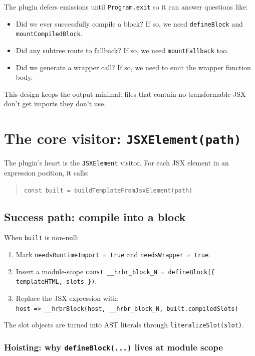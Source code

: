 The plugin defers emissions until \texttt{Program.exit} so it can answer questions like:

\begin{itemize}
\item Did we ever successfully compile a block? If so, we need \texttt{defineBlock} and \texttt{mountCompiledBlock}.
\item Did any subtree route to fallback? If so, we need \texttt{mountFallback} too.
\item Did we generate a wrapper call? If so, we need to emit the wrapper function body.
\end{itemize}

This design keeps the output minimal: files that contain no transformable JSX don't get imports they don't use.

\section{The core visitor: \texttt{JSXElement(path)}}

The plugin's heart is the \texttt{JSXElement} visitor.
For each JSX element in an expression position, it calls:

\begin{quote}
\texttt{const built = buildTemplateFromJsxElement(path)}
\end{quote}

\subsection{Success path: compile into a block}

When \texttt{built} is non-null:

\begin{enumerate}
\item Mark \texttt{needsRuntimeImport = true} and \texttt{needsWrapper = true}.
\item Insert a module-scope \texttt{const \_\_hrbr\_block\_N = defineBlock(\{ templateHTML, slots \})}.
\item Replace the JSX expression with:\\
\texttt{host => \_\_hrbrBlock(host, \_\_hrbr\_block\_N, built.compiledSlots)}
\end{enumerate}

The slot objects are turned into AST literals through \texttt{literalizeSlot(slot)}.

\subsubsection{Hoisting: why \texttt{defineBlock(...)} lives at module scope}

